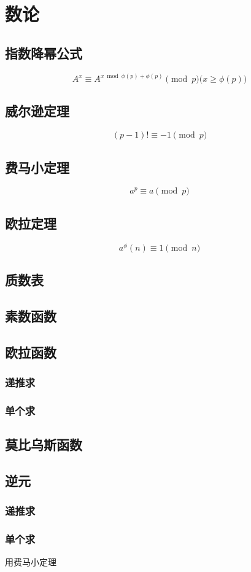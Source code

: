 \documentclass[../main.tex]{subfiles}
\begin{document}
\chapter{数论}
	\section{指数降幂公式}
		$$A^x \equiv A^{x \bmod {\phi(p)} + \phi(p)} \pmod{p} (x  \geq{\phi(p))}$$
	\section{威尔逊定理}
		$$(p-1)! \equiv -1 \pmod{p} $$
	\section{费马小定理}
		$$ a^p \equiv a \pmod{p} $$
	\section{欧拉定理}
		$$ a^\phi(n) \equiv 1 \pmod{n} $$
    \section{质数表}
            
    \section{素数函数}
            
    \section{欧拉函数}
    		\subsection{递推求}	
           
         \subsection{单个求}
         		
     \section{莫比乌斯函数}
            
    \section{逆元}
    		\subsection{递推求}
    			
    		\subsection{单个求}
    			用费马小定理
\end{document}
